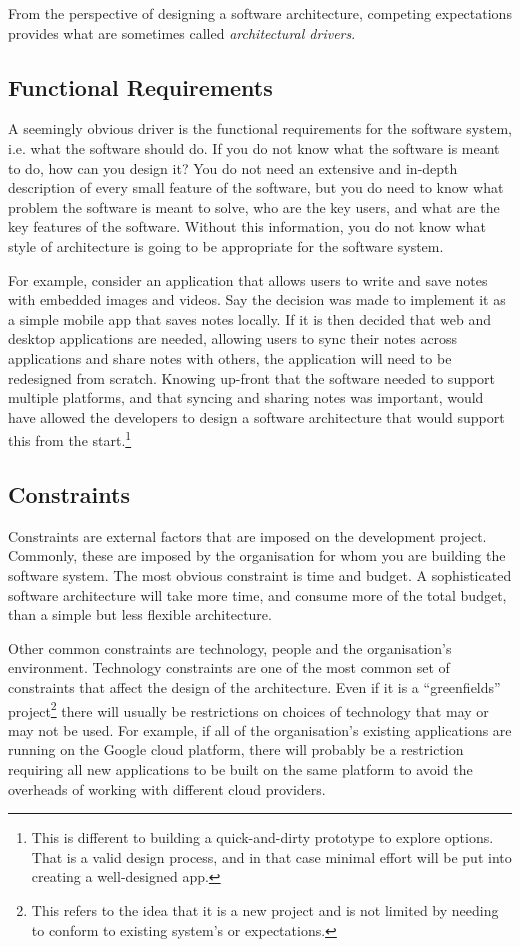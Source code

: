 From the perspective of designing a software architecture, competing expectations provides what are sometimes called \textit{architectural drivers}.

\subsection{Functional Requirements}
A seemingly obvious driver is the functional requirements for the software system, i.e. what the software should do.
If you do not know what the software is meant to do, how can you design it?
You do not need an extensive and in-depth description of every small feature of the software,
but you do need to know what problem the software is meant to solve, who are the key users,
and what are the key features of the software.
Without this information, you do not know what style of architecture is going to be appropriate for the software system.

For example, consider an application that allows users to write and save notes with embedded images and videos.
Say the decision was made to implement it as a simple mobile app that saves notes locally.
If it is then decided that web and desktop applications are needed, allowing users to sync their notes across applications and share notes with others,
the application will need to be redesigned from scratch.
Knowing up-front that the software needed to support multiple platforms, and that syncing and sharing notes was important, 
would have allowed the developers to design a software architecture that would support this from the start.\footnote{This is different to building a quick-and-dirty prototype
to explore options. That is a valid design process, and in that case minimal effort will be put into creating a well-designed app.}

\subsection{Constraints}
Constraints are external factors that are imposed on the development project.
Commonly, these are imposed by the organisation for whom you are building the software system.
The most obvious constraint is time and budget. A sophisticated software architecture will take more
time, and consume more of the total budget, than a simple but less flexible architecture.

Other common constraints are technology, people and the organisation's environment.
Technology constraints are one of the most common set of constraints that affect the design of the architecture.
Even if it is a ``greenfields'' project\footnote{This refers to the idea that it is a new project and is not limited by
needing to conform to existing system's or expectations.}
there will usually be restrictions on choices of technology that may or may not be used.
For example, if all of the organisation's existing applications are running on the Google cloud platform,
there will probably be a restriction requiring all new applications to be built on the same platform
to avoid the overheads of working with different cloud providers.


